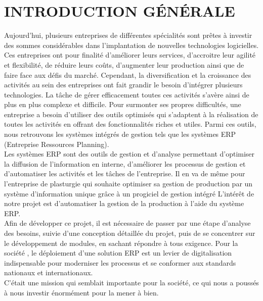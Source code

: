 \chapter*{INTRODUCTION GÉNÉRALE}
\adjustmtc
\thispagestyle{MyStyle}

\indent Aujourd’hui, plusieurs entreprises de différentes spécialités sont prêtes à investir des sommes considérables dans l’implantation de nouvelles technologies logicielles. Ces entreprises ont pour finalité d’améliorer leurs services, d’accroitre leur agilité et flexibilité, de réduire leurs coûts, d’augmenter leur production ainsi que de faire face aux défis du marché. Cependant, la diversification et la croissance des activités au sein des entreprises ont fait grandir le besoin d’intégrer plusieurs technologies. La tâche de gérer efficacement toutes ces activités s’avère ainsi de plus en plus complexe et difficile. Pour surmonter ses propres difficultés, une entreprise a besoin d’utiliser des outils optimisés qui s’adaptent à la réalisation de toutes les activités en offrant des fonctionnalités riches et utiles. Parmi ces outils, nous retrouvons les systèmes intégrés de gestion tels que les systèmes ERP (Entreprise Ressources Planning).\\Les systèmes ERP sont des outils de gestion et d’analyse permettant d’optimiser la diffusion de l’information en interne, d’améliorer les processus de gestion et d’automatiser les activités et les tâches de l’entreprise.
Il en va de même pour l’entreprise \reportEntreprise de plasturgie qui souhaite optimiser sa gestion de production par un système d'information unique grâce à un progiciel de gestion intégré L'intérêt de notre projet est d'automatiser la gestion de la production à l'aide du système ERP.\\
Afin de développer ce projet, il est nécessaire de passer par une étape d'analyse des besoins, suivie d'une conception détaillée du projet, puis de se concentrer sur le développement de modules, en sachant répondre à tous exigence.
Pour la société \reportEntreprise , le déploiement d'une solution ERP est un levier de digitalisation indispensable pour moderniser les processus et se conformer aux standards nationaux et internationaux.\\
C’était une mission qui semblait importante pour la société, ce qui nous a poussés à nous investir énormément pour la mener à bien.\\
